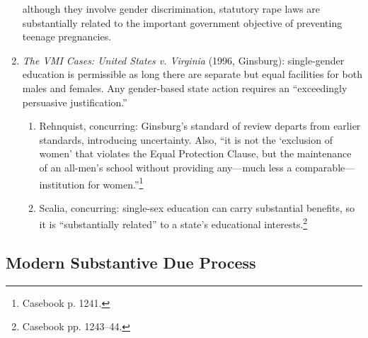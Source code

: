 \begin{enumerate}
    although they involve gender discrimination, statutory rape laws are 
    substantially related to the important government objective of preventing 
    teenage pregnancies.
    \item \emph{The VMI Cases: United States v. Virginia} (1996, Ginsburg): 
    single-gender education is permissible as long there are separate but 
    equal facilities for both males and females. Any gender-based state 
    action requires an ``exceedingly persuasive justification.''
    \begin{enumerate}
        \item Rehnquist, concurring: Ginsburg's standard of review departs 
        from earlier standards, introducing uncertainty. Also, ``it is not the 
        `exclusion of women' that violates the Equal Protection Clause, but 
        the maintenance of an all-men's school without providing any---much 
        less a comparable---institution for women.''\footnote{Casebook p. 
        1241.}
        \item Scalia, concurring: single-sex education can carry substantial 
        benefits, so it is ``substantially related'' to a state's educational 
        interests.\footnote{Casebook pp. 1243--44.}
    \end{enumerate}
\end{enumerate}

\subsection{Modern Substantive Due Process}


